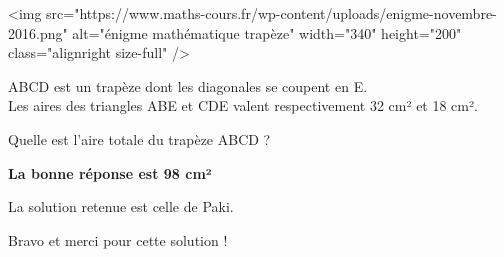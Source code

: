 
%
<img src="https://www.maths-cours.fr/wp-content/uploads/enigme-novembre-2016.png" alt="énigme mathématique trapèze" width="340" height="200" class="alignright size-full" />
\par
[Connaissances requises : à partir de la troisième]
\par

ABCD est un trapèze dont les diagonales se coupent en E.
\\
Les aires des triangles ABE et CDE valent respectivement 32 cm² et 18 cm².
\par
Quelle est l'aire totale du trapèze ABCD ?
\begin{solution}

     \textbf{La bonne réponse est 98 cm²}
\par
     La solution retenue est celle de Paki.
     \par
     Bravo et merci pour cette solution !
     \par
{}%
     \par
     [pdf-embedder url="/wp-content/uploads/slides/enigme-12-16/1.pdf" width="676"]
\end{solution}
